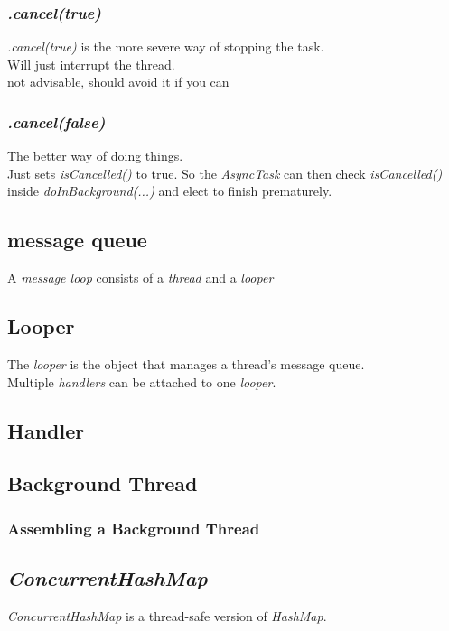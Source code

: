 \documentclass[]{article}
\renewcommand{\it}[1]{\textit{#1}}
\begin{document}
\subsubsection{\it{.cancel(true)}}
\textit{.cancel(true)} is the more severe way of stopping the task.
\\
Will just interrupt the thread.
\\
not advisable, should avoid it if you can
\subsubsection{\it{.cancel(false)}}
The better way of doing things.
\\
Just sets \textit{isCancelled()} to true.  So the \textit{AsyncTask} can then check \textit{isCancelled()} inside \textit{doInBackground(...)} and elect to finish prematurely.

\subsection{message queue}
A \it{message loop} consists of a \it{thread} and a \it{looper}

\subsection{Looper}
The \it{looper} is the object that manages a thread's message queue.
\\
Multiple \it{handlers}  can be attached to one \it{looper}.	

\subsection{Handler}

\subsection{Background Thread}
\subsubsection{Assembling a Background Thread}

\subsection{\it{ConcurrentHashMap}}
\it{ConcurrentHashMap} is a thread-safe version of \it{HashMap}.


\end{document}
